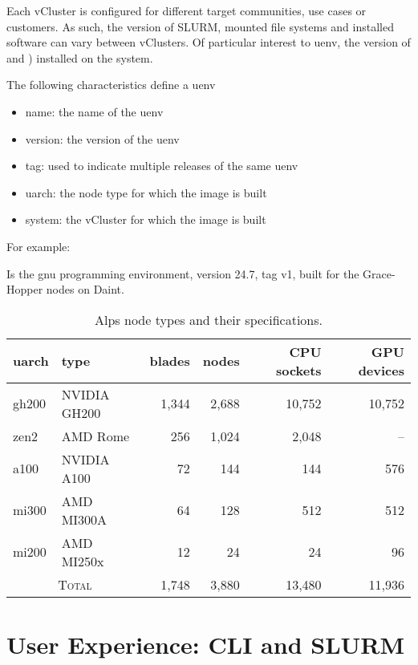 Each vCluster is configured for different target communities, use cases or customers.
As such, the version of SLURM, mounted file systems and installed software can vary between vClusters.
Of particular interest to uenv, the version of \xpmem and \libfabric) installed on the system.

The following characteristics define a uenv
\begin{itemize}
    \item name: the name of the uenv
    \item version: the version of the uenv
    \item tag: used to indicate multiple releases of the same uenv
    \item uarch: the node type for which the image is built
    \item system: the vCluster for which the image is built
\end{itemize}

For example: 

Is the gnu programming environment, version 24.7, tag v1, built for the Grace-Hopper nodes on Daint.

\begin{table*}[h!]
\centering
\begin{tabular}{llrrrr}
\toprule
uarch   & type         & blades & nodes & CPU sockets & GPU devices \\
\midrule
gh200   & NVIDIA GH200 & 1,344   & 2,688  & 10,752      & 10,752      \\
zen2    & AMD Rome     & 256     & 1,024  & 2,048       & --          \\
a100    & NVIDIA A100  & 72      & 144    & 144         & 576         \\
mi300   & AMD MI300A   & 64      & 128    & 512         & 512         \\
mi200   & AMD MI250x   & 12      & 24     & 24          & 96          \\
\midrule
\multicolumn{2}{c}{\textsc{Total}}      & 1,748   & 3,880  & 13,480  & 11,936 \\
\bottomrule
\end{tabular}
\caption{Alps node types and their specifications.}
\label{tab:alps-nodes}
\end{table*}

\section{User Experience: CLI and SLURM}

